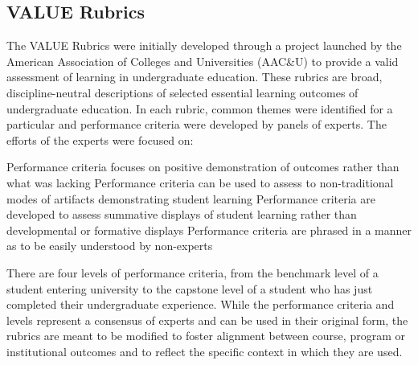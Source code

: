 \subsection{VALUE Rubrics}

The VALUE Rubrics were initially developed through a project launched by the American Association of Colleges and Universities (AAC&U)  to provide a valid assessment of learning in undergraduate education.  These rubrics are broad, discipline-neutral descriptions of selected essential learning outcomes of undergraduate education.  In each rubric, common themes were identified for a particular and performance criteria were developed by panels of experts.  The efforts of the experts were focused on:

Performance criteria focuses on positive demonstration of outcomes rather than what was lacking
Performance criteria can be used to assess to non-traditional modes of artifacts demonstrating student learning
Performance criteria are developed to assess summative displays of student learning rather than developmental or formative displays
Performance criteria are phrased in a manner as to be easily understood by non-experts

There are four levels of performance criteria, from the benchmark level of a student entering university to the capstone level of a student who has just completed their undergraduate experience.   While the performance criteria and levels represent a consensus of experts and can be used in their original form, the rubrics are meant to be modified to foster alignment between course, program or institutional outcomes and to reflect the specific context in which they are used.  